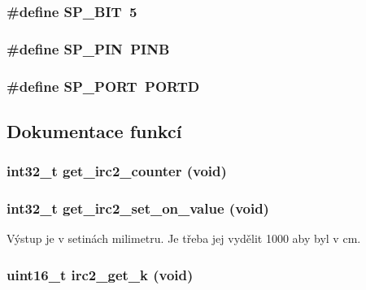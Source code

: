 \subsubsection[{SP\_\-BIT}]{\setlength{\rightskip}{0pt plus 5cm}\#define SP\_\-BIT~5}\label{irc2_8c_a2401c1030e02b8da7b3586e2f788d792}
\subsubsection[{SP\_\-PIN}]{\setlength{\rightskip}{0pt plus 5cm}\#define SP\_\-PIN~PINB}\label{irc2_8c_acb5711bd7b75243461976cb414b29c44}
\subsubsection[{SP\_\-PORT}]{\setlength{\rightskip}{0pt plus 5cm}\#define SP\_\-PORT~PORTD}\label{irc2_8c_a07104d9db9a8c1da66b457a777088113}


\subsection{Dokumentace funkcí}
\subsubsection[{get\_\-irc2\_\-counter}]{\setlength{\rightskip}{0pt plus 5cm}int32\_\-t get\_\-irc2\_\-counter (void)}\label{irc2_8c_a12bd5631a35458163e675a4738df8ac7}
\subsubsection[{get\_\-irc2\_\-set\_\-on\_\-value}]{\setlength{\rightskip}{0pt plus 5cm}int32\_\-t get\_\-irc2\_\-set\_\-on\_\-value (void)}\label{irc2_8c_aeae106a4dc2959c7a8e13ccdb9a43d95}


Výstup je v setinách milimetru. Je třeba jej vydělit 1000 aby byl v cm. 
\subsubsection[{irc2\_\-get\_\-k}]{\setlength{\rightskip}{0pt plus 5cm}uint16\_\-t irc2\_\-get\_\-k (void)}\label{irc2_8c_a8a8e13b00bbf1550a74a1aa2fd637470}
